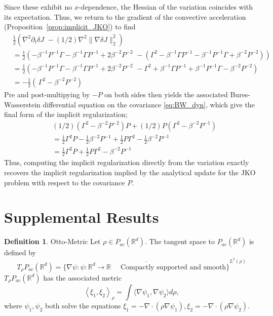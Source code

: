 \documentclass[reqno,11pt,letterpaper]{amsart}
\theoremstyle{plain}
\theoremstyle{definition}
\newtheorem{definition}{Definition}
\theoremstyle{remark}
\begin{document}
Since these exhibit no $x$-dependence, the Hessian of the variation coincides with its expectation. Thus, we return to the gradient of the convective acceleration (Proposition~\ref{prop:implicit_JKO}) to find
\begin{align*}
    & \frac12 ( \nabla^{2} \partial_{t} \delta J \, \, - (1/2) \nabla^{2} \lVert \nabla \delta J \rVert_{2}^{2} ) \\
    &= \frac{1}{2} \left( -\beta^{-1} P^{-1} \Gamma - \beta^{-1} \Gamma P^{-1} + 2\beta^{-2} P^{-2} \, \, - \left( \Gamma^{2} - \beta^{-1} \Gamma P^{-1} -\beta^{-1} P^{-1} \Gamma + \beta^{-2} P^{-2} \right) \right) \\
    &= \frac{1}{2} \left( -\beta^{-1} P^{-1} \Gamma - \beta^{-1} \Gamma P^{-1} + 2\beta^{-2} P^{-2} \, \, - \Gamma^{2} + \beta^{-1} \Gamma P^{-1} + \beta^{-1} P^{-1} \Gamma - \beta^{-2} P^{-2} \right) \\
    &= -\frac{1}{2} \left( \, \Gamma^{2} - \beta^{-2} P^{-2} \right)
\end{align*}
Pre and post-multipying by $-P$ on both sides then yields the associated Bures-Wasserstein differential equation on the covariance \eqref{eq:BW_dyn}, which give the final form of the implicit regularization;
\begin{align*}
    &(1/2) (\Gamma^{2} - \beta^{-2} P^{-2}) P + (1/2) P(\Gamma^{2} - \beta^{-2} P^{-1}) \\
    &= \frac{1}{2}\Gamma^{2} P - \frac{1}{2} \beta^{-2} P^{-1} + \frac{1}{2} P \Gamma^{2} - \frac{1}{2}\beta^{-2} P^{-1} \\
    &= \frac{1}{2}\Gamma^{2} P + \frac{1}{2} P \Gamma^{2} - \beta^{-2} P^{-1}
\end{align*}
Thus, computing the implicit regularization directly from the variation exactly recovers the implicit regularization implied by the analytical update for the JKO problem with respect to the covariance $P$.

\section*{Supplemental Results}\label{sec:supp_res}

\begin{definition}{Otto-Metric}
    Let $\rho \in {P}_{ac}(\mathbb{R}^{d})$. The tangent space to ${P}_{ac}(\mathbb{R}^{d})$ is defined by
    \[
    T_{\rho}{P}_{ac}(\mathbb{R}^{d}) = \overline{ \{
    \nabla \psi : \psi: \mathbb{R}^{d} \to \mathbb{R} \quad \text{ Compactly supported and smooth}
    \} }^{L^{2}(\rho)}
    \]
    $T_{\rho}{P}_{ac}(\mathbb{R}^{d})$ has the associated metric
    \[
    \left\langle \xi_{1}, \xi_{2} \right\rangle_{\rho} = \int \langle \nabla \psi_{1}, \nabla \psi_{2} \rangle d \rho,
    \]
    where $\psi_{1}, \psi_{2}$ both solve the equations $\xi_{1} = - \nabla \cdot (\rho \nabla \psi_{1}), \xi_{2} = - \nabla \cdot (\rho \nabla \psi_{2})$. 
\end{definition}
\end{document}
